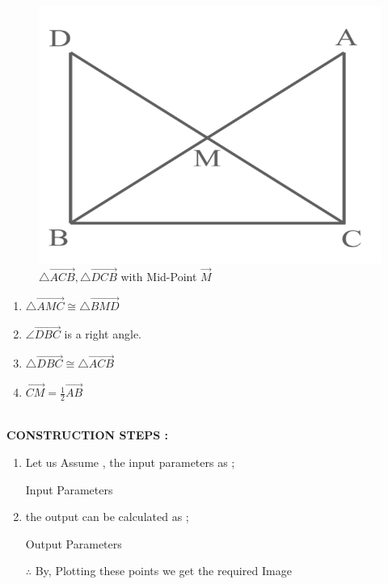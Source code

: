 \begin{enumerate}[label=\thesection.\arabic*,ref=\thesection.\theenumi]
\begin{figure}[H]
  \includegraphics[width=\columnwidth]{figs/Screenshot.png}
  \caption{$\triangle \vec{ACB} ,\triangle \vec{DCB}$ with Mid-Point $\vec{M}$}
  \label{fig:triangles}
\end{figure}
\begin{enumerate}[label =(\roman*)]
        \item $\triangle \vec{AMC} \cong \triangle \vec{BMD}$
        \item $\angle \vec{DBC}$ is a right angle. 
        \item $\triangle \vec{DBC} \cong  \triangle \vec{ACB}$ 
        \item $\vec{CM} = \frac{1}{2} \vec{AB}$
\end{enumerate}
\pagebreak
\solution\\
\textbf{CONSTRUCTION STEPS :}
\begin{enumerate}
\item Let us Assume , the input parameters as ;
\begin{table}[H]
\centering
        
          \caption{Input Parameters}
          \label{Table-1:Input_params}
\end{table}
\item the output can be calculated as ;
\begin{table}[H]
\centering
        
          \caption{Output Parameters}
          \label{Table-2:Output_params}
\end{table}
                $\therefore$ By, Plotting these points we get the required Image 
\begin{figure}[H]

\end{figure}
\end{enumerate}
\end{enumerate}
